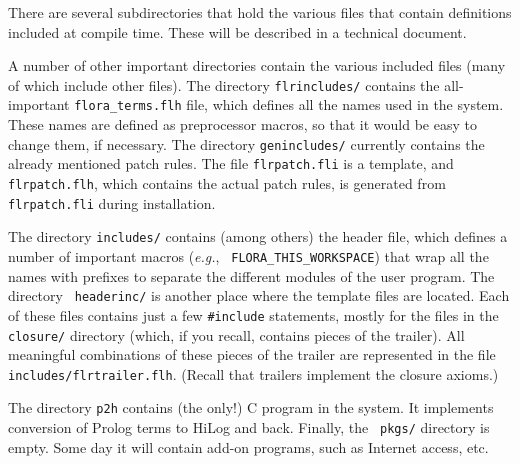 \documentclass[11pt]{article}
\begin{document}
There are several subdirectories that hold the various files that contain
definitions included at compile time. These will be described in a
technical document.

A number of other important directories contain the various included files
(many of which include other files). The directory {\tt flrincludes/}
contains the all-important {\tt flora\_terms.flh} file, which defines all
the names used in the system. These names are defined as preprocessor
macros, so that it would be easy to change them, if necessary.
The directory {\tt genincludes/} currently contains the already mentioned
patch rules. The file {\tt flrpatch.fli} is a template, and {\tt
  flrpatch.flh}, which contains the actual patch rules, is generated from
{\tt flrpatch.fli} during installation.

The directory {\tt includes/} contains (among others) the header file,
which defines a number of important macros ({\it e.g.}, {\tt
  FLORA\_THIS\_WORKSPACE}) that wrap all the names with prefixes to
separate the different modules of the user program.  The directory {\tt
  headerinc/} is another place where the template files are located. Each
of these files contains just a few {\tt \#include} statements, mostly for
the files in the {\tt closure/} directory (which, if you recall, contains
pieces of the trailer). All meaningful combinations of these pieces of the
trailer are represented in the file {\tt includes/flrtrailer.flh}.  (Recall
that trailers implement the closure axioms.)

The directory {\tt p2h} contains (the only!) C program in the system. It
implements conversion of Prolog terms to HiLog and back. Finally, the {\tt
  pkgs/} directory is empty. Some day it will contain add-on programs, such
as Internet access, etc.


\newpage



\printindex
\end{document}
